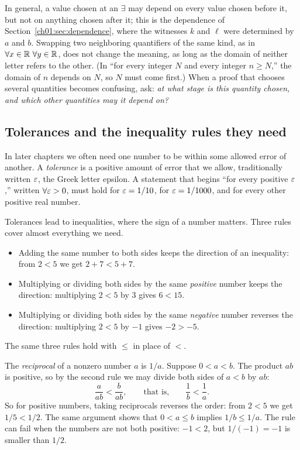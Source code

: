 In general, a value chosen at an $\exists$ may depend on every value chosen before it, but not on anything chosen after it; this is the dependence of Section~\ref{ch01:sec:dependence}, where the witnesses $k$ and $\ell$ were determined by $a$ and $b$. Swapping two neighboring quantifiers of the same kind, as in $\forall x\in\mathbb R\ \forall y\in\mathbb R$, does not change the meaning, as long as the domain of neither letter refers to the other. (In ``for every integer $N$ and every integer $n\ge N$,'' the domain of $n$ depends on $N$, so $N$ must come first.) When a proof that chooses several quantities becomes confusing, ask: \emph{at what stage is this quantity chosen, and which other quantities may it depend on?}

\subsection*{Tolerances and the inequality rules they need}
In later chapters we often need one number to be within some allowed error of another. A \emph{tolerance} is a positive amount of error that we allow, traditionally written $\varepsilon$, the Greek letter epsilon. A statement that begins ``for every positive $\varepsilon$,'' written $\forall\varepsilon>0$, must hold for $\varepsilon=1/10$, for $\varepsilon=1/1000$, and for every other positive real number.

Tolerances lead to inequalities, where the sign of a number matters. Three rules cover almost everything we need.
\begin{itemize}
\item Adding the same number to both sides keeps the direction of an inequality: from $2<5$ we get $2+7<5+7$.
\item Multiplying or dividing both sides by the same \emph{positive} number keeps the direction: multiplying $2<5$ by $3$ gives $6<15$.
\item Multiplying or dividing both sides by the same \emph{negative} number reverses the direction: multiplying $2<5$ by $-1$ gives $-2>-5$.
\end{itemize}
The same three rules hold with $\le$ in place of $<$.

The \emph{reciprocal} of a nonzero number $a$ is $1/a$. Suppose $0<a<b$. The product $ab$ is positive, so by the second rule we may divide both sides of $a<b$ by $ab$:
\[
\frac{a}{ab}<\frac{b}{ab},\qquad\text{that is,}\qquad \frac1b<\frac1a.
\]
So for positive numbers, taking reciprocals reverses the order: from $2<5$ we get $1/5<1/2$. The same argument shows that $0<a\le b$ implies $1/b\le1/a$. The rule can fail when the numbers are not both positive: $-1<2$, but $1/(-1)=-1$ is smaller than $1/2$.

